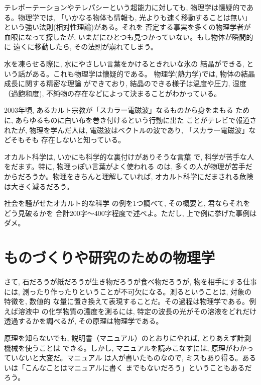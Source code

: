 \begin{exmpl}テレポーテーションやテレパシーという超能力に対しても, 
物理学は懐疑的である。物理学では, 「いかなる物体も情報も, 
光よりも速く移動することは無い」という強い法則(相対性理論)がある。それを
否定する事実を多くの物理学者が血眼になって探したが, 
いまだにひとつも見つかっていない。もし物体が瞬間的に
遠くに移動したら, その法則が崩れてしまう。\end{exmpl}

\begin{exmpl}水を凍らせる際に, 水にやさしい言葉をかけるときれいな氷の
結晶ができる, という話がある。これも物理学は懐疑的である。
物理学(熱力学)では, 物体の結晶成長に関する精密な理論
ができており, 結晶のできる様子は温度や圧力, 湿度（過飽和度), 
不純物の存在などによって決まることがわかっている。\end{exmpl}

\begin{exmpl}2003年頃, あるカルト宗教が「スカラー電磁波」なるものから身をまもる
ために, あらゆるものに白い布を巻き付けるという行動に出た
ことがテレビで報道されたが, 物理を学んだ人は, 
電磁波はベクトルの波であり, 「スカラー電磁波」などそもそも
存在しないと知っている。\end{exmpl}\mv

オカルト科学は, いかにも科学的な裏付けがありそうな言葉
で, 科学が苦手な人をだます。特に, 物理っぽい言葉がよく使われる
のは, 多くの人が物理が苦手だからだろうか。物理をきちんと理解していれば, 
オカルト科学にだまされる危険は大きく減るだろう。\mv

\begin{q}\label{q:fake_science} 社会を騒がせたオカルト的な科学
の例を1つ調べて, その概要と, 君ならそれをどう見破るかを
合計200字〜400字程度で述べよ。ただし, 上で例に挙げた事例はダメ。\end{q}
\hv


\section{ものづくりや研究のための物理学}
さて, 石だろうが紙だろうが生き物だろうが食べ物だろうが, 物を相手にする仕事には, 
測ったり作ったりということが不可欠になる。測るということは, 対象の特徴を, 数値的
な量に置き換えて表現することだ。その過程は物理学である。例えば溶液中
の化学物質の濃度を測るには, 特定の波長の光がその溶液をどれだけ透過するかを調べるが, 
その原理は物理学である。

原理を知らないでも, 説明書（マニュアル）のとおりにやれば, とりあえず計測機械を使うことは
できる。しかし, マニュアルを読みこなすには, 原理がわかっていないと大変だ。マニュアル
は人が書いたものなので, ミスもあり得る。あるいは「こんなことはマニュアルに書く
までもないだろう」ということもあるだろう。

